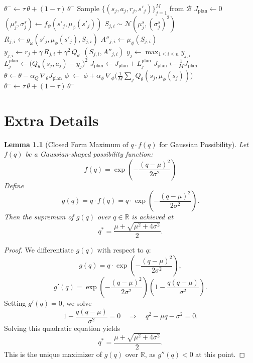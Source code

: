 \documentclass[11pt,a4paper]{report}
\newtheorem{lemma}{Lemma}
\begin{document}
\begin{algorithm}[ht]
\begin{algorithmic}[1]
    \State $\theta^- \!\gets\! \tau\,\theta + (1-\tau)\,\theta^-$
  \EndIf
   
    \State Sample $\{(s_j,a_j,r_j,s'_j)\}_{j=1}^M$ from $\mathcal B$
    \State $J_{\text{plan}}\gets 0$
      \State $(\mu^s_j{},\sigma^s_j)\gets f_\psi(s'_j,\mu_\phi(s'_j))$
        \State $S_{j,i}\sim\mathcal N(\mu^s_j,(\sigma^s_j)^2)$
        \State $R_{j,i}\gets g_\omega(s'_j,\mu_\phi(s'_j),S_{j,i})$
        \State $A''_{j,i}\gets \mu_\phi(S_{j,i})$
        \State $y_{j,i}\gets r_j + \gamma\,R_{j,i} + \gamma^2\,Q_{\theta^-}(S_{j,i},A''_{j,i})$
      \EndFor
      \State $y_j\gets \max_{1\le i\le n} y_{j,i}$
      \State $L^{\text{plan}}_j \gets \bigl(Q_\theta(s_j,a_j) - y_j\bigr)^2$
      \State $J_{\text{plan}}\gets J_{\text{plan}} + L^{\text{plan}}_j$
    \EndFor
    \State $J_{\text{plan}}\gets \tfrac{1}{M}J_{\text{plan}}$
    \State $\theta \!\gets\! \theta - \alpha_Q\,\nabla_\theta J_{\text{plan}}$
    \State $\phi \;\gets\;\phi + \alpha_\phi\,\nabla_\phi\bigl(\tfrac{1}{M}\sum_j Q_\theta(s_j,\mu_\phi(s_j))\bigr)$
    \State $\theta^- \!\gets\! \tau\,\theta + (1-\tau)\,\theta^-$
  \EndIf
\EndFor
\end{algorithmic}
\end{algorithm}
\chapter{Extra Details}

\begin{lemma}[Closed Form Maximum of $q \cdot f(q)$ for Gaussian Possibility]
\label{lem:max_expected_gauss}
Let $f(q)$ be a Gaussian-shaped possibility function: 
\[ f(q) = \exp\left(-\frac{(q - \mu)^2}{2\sigma^2} \right) \]
Define
\[
g(q) = q \cdot f(q) = q \cdot \exp\left(-\frac{(q - \mu)^2}{2\sigma^2} \right).
\]
Then the supremum of \( g(q) \) over \( q \in \mathbb{R} \) is achieved at
\[
q^* = \frac{\mu + \sqrt{\mu^2 + 4\sigma^2}}{2}.
\]
\end{lemma}

\begin{proof}
We differentiate \( g(q) \) with respect to \( q \):
\[
g(q) = q \cdot \exp\left(-\frac{(q - \mu)^2}{2\sigma^2} \right),
\]
\[
g'(q) = \exp\left(-\frac{(q - \mu)^2}{2\sigma^2} \right) \left( 1 - \frac{q(q - \mu)}{\sigma^2} \right).
\]
Setting \( g'(q) = 0 \), we solve
\[
1 - \frac{q(q - \mu)}{\sigma^2} = 0 \quad \Rightarrow \quad q^2 - \mu q - \sigma^2 = 0.
\]
Solving this quadratic equation yields
\[
q^* = \frac{\mu + \sqrt{\mu^2 + 4\sigma^2}}{2}.
\]
This is the unique maximizer of \( g(q) \) over \( \mathbb{R} \), as \( g''(q) < 0 \) at this point.
\end{proof}
\end{document}
